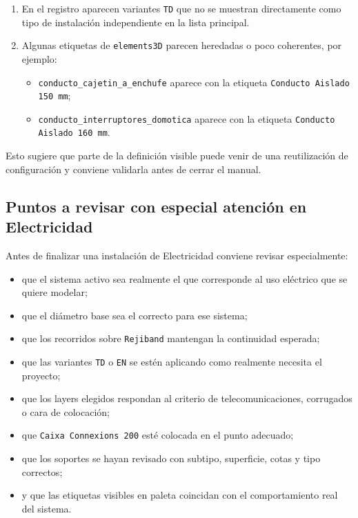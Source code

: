 \documentclass[12pt,a4paper]{article}
\begin{document}
\begin{enumerate}
\item En el registro aparecen variantes \texttt{TD} que no se muestran directamente como tipo de instalación independiente en la lista principal.
\item Algunas etiquetas de \texttt{elements3D} parecen heredadas o poco coherentes, por ejemplo:
\begin{itemize}
\item \texttt{conducto\_cajetin\_a\_enchufe} aparece con la etiqueta \texttt{Conducto Aislado 150 mm};
\item \texttt{conducto\_interruptores\_domotica} aparece con la etiqueta \texttt{Conducto Aislado 160 mm}.
\end{itemize}
\end{enumerate}

Esto sugiere que parte de la definición visible puede venir de una reutilización de configuración y conviene validarla antes de cerrar el manual.

\subsection{Puntos a revisar con especial atención en Electricidad}

Antes de finalizar una instalación de Electricidad conviene revisar especialmente:

\begin{itemize}
\item que el sistema activo sea realmente el que corresponde al uso eléctrico que se quiere modelar;
\item que el diámetro base sea el correcto para ese sistema;
\item que los recorridos sobre \texttt{Rejiband} mantengan la continuidad esperada;
\item que las variantes \texttt{TD} o \texttt{EN} se estén aplicando como realmente necesita el proyecto;
\item que los layers elegidos respondan al criterio de telecomunicaciones, corrugados o cara de colocación;
\item que \texttt{Caixa Connexions 200} esté colocada en el punto adecuado;
\item que los soportes se hayan revisado con subtipo, superficie, cotas y tipo correctos;
\item y que las etiquetas visibles en paleta coincidan con el comportamiento real del sistema.
\end{itemize}
\end{document}
